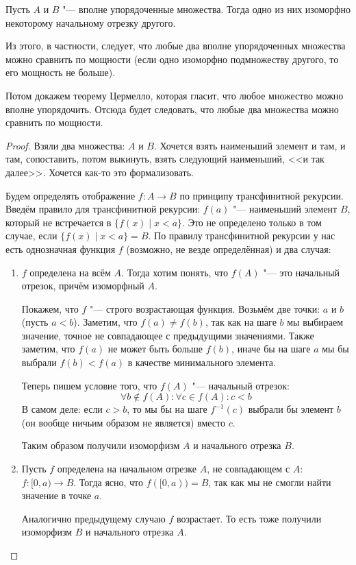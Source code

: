 \begin{theorem}
	Пусть $A$ и $B$ "--- вполне упорядоченные множества.
	Тогда одно из них изоморфно некоторому начальному отрезку другого.
\end{theorem}
\begin{Rem}
	Из этого, в частности, следует, что любые два вполне упорядоченных множества
	можно сравнить по мощности (если одно изоморфно подмножеству другого, то его мощность не больше).

	Потом докажем теорему Цермелло, которая гласит, что любое множество можно вполне упорядочить.
	Отсюда будет следовать, что любые два множества можно сравнить по мощности.
\end{Rem}
\begin{proof}
	Взяли два множества: $A$ и $B$.
	Хочется взять наименьший элемент и там, и там, сопоставить, потом выкинуть, взять
	следующий наименьший, <<и так далее>>.
	Хочется как-то это формализовать.

	Будем определять отображение $f \colon A \to B$ по принципу трансфинитной рекурсии.
	Введём правило для трансфинитной рекурсии: $f(a)$ "--- наименьший элемент $B$, который не встречается в $\{ f(x) \mid x < a \}$.
	Это не определено только в том случае, если $\{ f(x) \mid x < a \} = B$.
	По правилу трансфинитной рекурсии у нас есть однозначная функция $f$ (возможно, не везде определённая) и два случая:
	\begin{enumerate}
		\item
			$f$ определена на всём $A$.
			Тогда хотим понять, что $f(A)$ "--- это начальный отрезок, причём изоморфный $A$.

			Покажем, что $f$ "--- строго возрастающая функция.
			Возьмём две точки: $a$ и $b$ (пусть $a < b$).
			Заметим, что $f(a) \neq f(b)$, так как на шаге $b$ мы выбираем значение,
			точное не совпадающее с предыдущими значениями.
			Также заметим, что $f(a)$ не может быть больше $f(b)$, иначе бы
			на шаге $a$ мы бы выбрали $f(b) < f(a)$ в качестве минимального элемента.

			Теперь пишем условие того, что $f(A)$ "--- начальный отрезок:
			\[ \forall b \notin f(A) \colon \forall c \in f(A) \colon c < b \]
			В самом деле: если $c > b$, то мы бы на шаге $f^{-1}(c)$ выбрали бы
			элемент $b$ (он вообще ничьим образом не является) вместо $c$.

			Таким образом получили изоморфизм $A$ и начального отрезка $B$.

		\item
			Пусть $f$ определена на начальном отрезке $A$, не совпадающем с $A$: $f \colon [0, a) \to B$.
			Тогда ясно, что $f([0, a)) = B$, так как мы не смогли найти значение в точке $a$.

			Аналогично предыдущему случаю $f$ возрастает.
			То есть тоже получили изоморфизм $B$ и начального отрезка $A$.
      \end{enumerate}
\end{proof}

